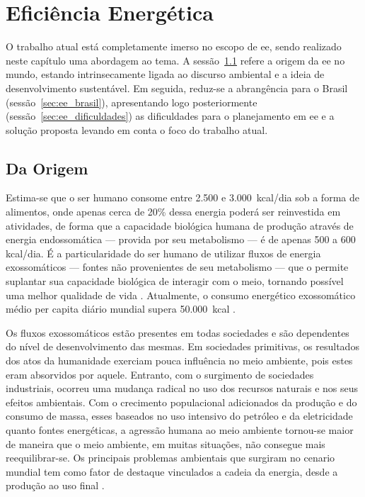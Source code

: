 \chapter{Eficiência Energética}
\label{chap:ee}
\glsresetall

O trabalho atual está completamente imerso no escopo de \gls{ee},
sendo realizado neste capítulo uma abordagem ao tema. 
A sessão~\ref{sec:ee_origem} refere a origem da \gls{ee} no mundo, estando
intrinsecamente ligada ao discurso ambiental e a ideia de desenvolvimento
sustentável. Em seguida, reduz-se a abrangência para o Brasil
(sessão~\ref{sec:ee_brasil}), apresentando logo posteriormente
(sessão~\ref{sec:ee_dificuldades}) as dificuldades para o planejamento em \gls{ee} 
e a solução proposta levando em conta o foco do trabalho atual.

\section{Da Origem}
\label{sec:ee_origem}

Estima-se que o ser humano consome entre 2.500 e 3.000~\acrshort{kcal}/dia sob a 
forma de alimentos, onde apenas cerca de 20\% dessa energia poderá ser 
reinvestida em atividades, de forma que a capacidade biológica humana de produção
através de energia endossomática --- provida por seu metabolismo --- é de 
apenas 500 a 600 \acrshort{kcal}/dia. É a particularidade do ser humano de
utilizar fluxos de energia exossomáticos --- fontes não provenientes de seu metabolismo 
--- que o permite suplantar sua capacidade biológica de interagir com o meio,
tornando possível uma melhor qualidade de vida \cite{rippel}. 
Atualmente, o consumo energético exossomático médio per capita diário 
mundial supera 50.000~\acrshort{kcal} \cite{world_statics_2012}.

Os fluxos exossomáticos estão presentes em todas sociedades e são dependentes do
nível de desenvolvimento das mesmas. Em sociedades primitivas, os resultados dos
atos da humanidade exerciam pouca influência no meio ambiente, pois estes eram
absorvidos por aquele. Entranto, com o surgimento de sociedades industriais,
ocorreu uma mudança radical no uso dos recursos naturais e nos seus efeitos
ambientais. Com o crecimento populacional adicionados da produção e do consumo 
de massa, esses baseados no uso intensivo do petróleo e da eletricidade quanto 
fontes energéticas, a agressão humana ao meio ambiente tornou-se maior de maneira 
que o meio ambiente, em muitas situações, não consegue mais reequilibrar-se. 
Os principais problemas ambientais que surgiram no cenario mundial tem 
como fator de destaque vinculados a cadeia da energia, 
desde a produção ao uso final \cite{rippel,jatoba}.

